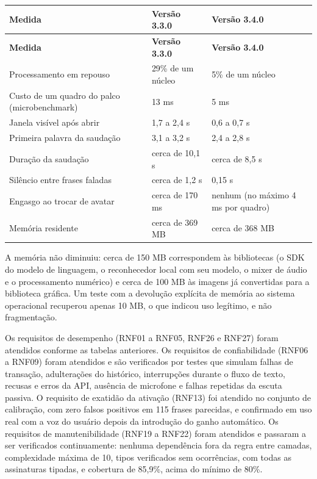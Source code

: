 \begin{singlespace}
\label{tab:desempenho34}
\small
\begin{tabularx}{\textwidth}{LP{3.6cm}P{3.6cm}}
\toprule
\textbf{Medida} & \textbf{Versão 3.3.0} & \textbf{Versão 3.4.0} \\ \midrule
\endfirsthead
\toprule
\textbf{Medida} & \textbf{Versão 3.3.0} & \textbf{Versão 3.4.0} \\ \midrule
\endhead
Processamento em repouso & 29\% de um núcleo & 5\% de um núcleo \\
Custo de um quadro do palco (microbenchmark) & 13 ms & 5 ms \\
Janela visível após abrir & 1,7 a 2,4 s & 0,6 a 0,7 s \\
Primeira palavra da saudação & 3,1 a 3,2 s & 2,4 a 2,8 s \\
Duração da saudação & cerca de 10,1 s & cerca de 8,5 s \\
Silêncio entre frases faladas & cerca de 1,2 s & 0,15 s \\
Engasgo ao trocar de avatar & cerca de 170 ms & nenhum (no máximo 4 ms por quadro) \\
Memória residente & cerca de 369 MB & cerca de 368 MB \\
\bottomrule
\end{tabularx}
\end{singlespace}

A memória não diminuiu: cerca de 150 MB correspondem às bibliotecas (o SDK do modelo de linguagem,
o reconhecedor local com seu modelo, o mixer de áudio e o processamento numérico) e cerca de 100 MB às
imagens já convertidas para a biblioteca gráfica. Um teste com a devolução explícita de memória ao
sistema operacional recuperou apenas 10 MB, o que indicou uso legítimo, e não fragmentação.

Os requisitos de desempenho (RNF01 a RNF05, RNF26 e RNF27) foram atendidos conforme as tabelas
anteriores. Os requisitos de confiabilidade (RNF06 a RNF09) foram atendidos e são verificados por testes que
simulam falhas de transação, adulterações do histórico, interrupções durante o fluxo de texto, recusas
e erros da API, ausência de microfone e falhas repetidas da escuta passiva. O requisito de exatidão da
ativação (RNF13) foi atendido no conjunto de calibração, com zero falsos positivos em 115 frases
parecidas, e confirmado em uso real com a voz do usuário depois da introdução do ganho automático.
Os requisitos de manutenibilidade (RNF19 a RNF22) foram atendidos e passaram a ser verificados
continuamente: nenhuma dependência fora da regra entre camadas, complexidade máxima de 10, tipos
verificados sem ocorrências, com todas as assinaturas tipadas, e cobertura de 85,9\%, acima do mínimo
de 80\%.


